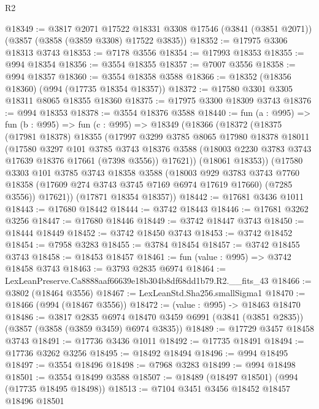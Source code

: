 \begin{lexlean}{R2}
\begin{coremodule}
@18349 := @3817
    @2071
    @17522
    @18331
    @3308
    @17546
    (@3841 (@3851 @2071))
    (@3857 (@3858 (@3859 @3308) @17522 @3835))
@18352 := @17975 @3306 @18313 @3743
@18353 := @7178 @3556
@18354 := @17993 @18353
@18355 := @994 @18354
@18356 := @3554 @18355
@18357 := @7007 @3556
@18358 := @994 @18357
@18360 := @3554 @18358 @3588
@18366 := @18352 (@18356 @18360) (@994 (@17735 @18354 @18357))
@18372 := @17580 @3301 @3305 @18311 @8065 @18355 @18360
@18375 := @17975 @3300 @18309 @3743
@18376 := @994 @18353
@18378 := @3554 @18376 @3588
@18440 := fun (a : @995) =>
  fun (b : @995) =>
  fun (c : @995) =>
  @18349
    (@18366
      (@18372
        (@18375
          (@17981 @18378)
          @18355
          (@17997
            @3299
            @3785
            @8065
            @17980
            @18378
            @18011
            (@17580
              @3297
              @101
              @3785
              @3743
              @18376
              @3588
              (@18003 @2230 @3783 @3743 @17639 @18376 @17661 (@7398 @3556))
              @17621))
          (@18061 @18353))
        (@17580
          @3303
          @101
          @3785
          @3743
          @18358
          @3588
          (@18003
            @929
            @3783
            @3743
            @7760
            @18358
            (@17609 @274 @3743 @3745 @7169 @6974 @17619 @17660)
            (@7285 @3556))
          @17621))
      (@17871 @18354 @18357))
@18442 := @17681 @3436 @1011
@18443 := @17680 @18442
@18444 := @3742 @18443
@18446 := @17681 @3262 @3256
@18447 := @17680 @18446
@18449 := @3742 @18447 @3743
@18450 := @18444 @18449
@18452 := @3742 @18450 @3743
@18453 := @3742 @18452
@18454 := @7958 @3283
@18455 := @3784 @18454
@18457 := @3742 @18455 @3743
@18458 := @18453 @18457
@18461 := fun (value : @995) => @3742 @18458 @3743
@18463 := @3793 @2835 @6974
@18464 := LexLeanPreserve.Ca8888aaf66639e18b304b8df68dd1b79.R2.__fits_43
@18466 := @3802 (@18464 @3556)
@18467 := LexLeanStd.Sha256.smallSigma1
@18470 := @18466 (@994 (@18467 @3556))
@18472 := (value : @995) -> @18463 @18470
@18486 := @3817
    @2835
    @6974
    @18470
    @3459
    @6991
    (@3841 (@3851 @2835))
    (@3857 (@3858 (@3859 @3459) @6974 @3835))
@18489 := @17729 @3457 @18458 @3743
@18491 := @17736 @3436 @1011
@18492 := @17735 @18491
@18494 := @17736 @3262 @3256
@18495 := @18492 @18494
@18496 := @994 @18495
@18497 := @3554 @18496
@18498 := @7968 @3283
@18499 := @994 @18498
@18501 := @3554 @18499 @3588
@18507 := @18489 (@18497 @18501) (@994 (@17735 @18495 @18498))
@18513 := @7104 @3451 @3456 @18452 @18457 @18496 @18501

\end{coremodule}
\end{lexlean}
